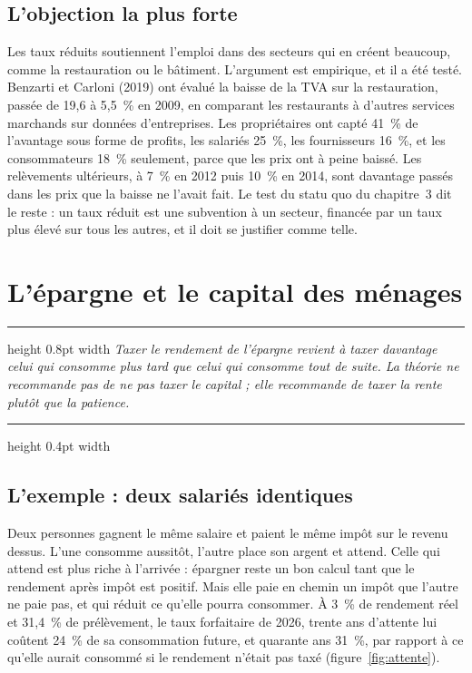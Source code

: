 \documentclass[11pt,a4paper]{article}
\newenvironment{argument}
  {\par\smallskip\noindent\begin{minipage}{\linewidth}%
   \color{encre}\hrule height 0.8pt width \linewidth \vspace{7pt}%
   \large\itshape}
  {\par\vspace{7pt}\hrule height 0.4pt width \linewidth\end{minipage}\par\medskip}
\begin{document}
\subsection{L'objection la plus forte}

Les taux réduits soutiennent l'emploi dans des secteurs qui en créent beaucoup, comme la
restauration ou le bâtiment. L'argument est empirique, et il a été testé. Benzarti et Carloni
(2019) ont évalué la baisse de la TVA sur la restauration, passée de 19,6 à 5,5~\% en 2009, en
comparant les restaurants à d'autres services marchands sur données d'entreprises. Les propriétaires
ont capté 41~\% de l'avantage sous forme de profits, les salariés 25~\%, les fournisseurs 16~\%, et
les consommateurs 18~\% seulement, parce que les prix ont à peine baissé. Les relèvements
ultérieurs, à 7~\% en 2012 puis 10~\% en 2014, sont davantage passés dans les prix que la baisse ne
l'avait fait. Le test du statu quo du chapitre~3 dit le reste : un taux réduit est une subvention à
un secteur, financée par un taux plus élevé sur tous les autres, et il doit se justifier comme
telle.

\section{L'épargne et le capital des ménages}

\begin{argument}
Taxer le rendement de l'épargne revient à taxer davantage celui qui consomme plus tard que celui
qui consomme tout de suite. La théorie ne recommande pas de ne pas taxer le capital ; elle
recommande de taxer la rente plutôt que la patience.
\end{argument}

\subsection{L'exemple : deux salariés identiques}

Deux personnes gagnent le même salaire et paient le même impôt sur le revenu dessus. L'une consomme
aussitôt, l'autre place son argent et attend. Celle qui attend est plus riche à l'arrivée :
épargner reste un bon calcul tant que le rendement après impôt est positif. Mais elle paie en
chemin un impôt que l'autre ne paie pas, et qui réduit ce qu'elle pourra consommer. À 3~\% de
rendement réel et 31,4~\% de prélèvement, le taux forfaitaire de 2026, trente ans d'attente lui
coûtent 24~\% de sa consommation future, et quarante ans 31~\%, par rapport à ce qu'elle aurait
consommé si le rendement n'était pas taxé (figure~\ref{fig:attente}).
\end{document}
